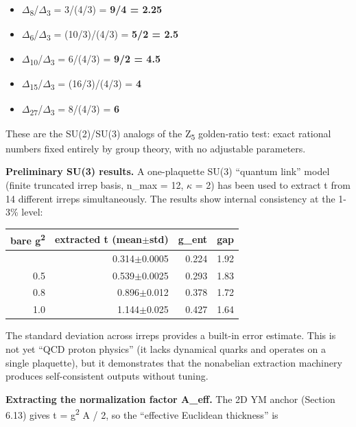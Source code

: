 \documentclass[11pt,a4paper]{article}
\theoremstyle{remark}
\providecommand{\tightlist}{%
  \setlength{\itemsep}{0pt}\setlength{\parskip}{0pt}}
\begin{document}
\begin{itemize}
\tightlist
\item
  \ensuremath{\Delta}\textsubscript{8}/\ensuremath{\Delta}\textsubscript{3} = 3/(4/3) = \textbf{9/4 = 2.25}
\item
  \ensuremath{\Delta}\textsubscript{6}/\ensuremath{\Delta}\textsubscript{3} = (10/3)/(4/3) = \textbf{5/2 = 2.5}
\item
  \ensuremath{\Delta}\textsubscript{10}/\ensuremath{\Delta}\textsubscript{3} = 6/(4/3) = \textbf{9/2 = 4.5}
\item
  \ensuremath{\Delta}\textsubscript{15}/\ensuremath{\Delta}\textsubscript{3} = (16/3)/(4/3) = \textbf{4}
\item
  \ensuremath{\Delta}\textsubscript{27}/\ensuremath{\Delta}\textsubscript{3} = 8/(4/3) = \textbf{6}
\end{itemize}

These are the SU(2)/SU(3) analogs of the Z\textsubscript{5} golden-ratio test: exact
rational numbers fixed entirely by group theory, with no adjustable parameters.

\textbf{Preliminary SU(3) results.} A one-plaquette SU(3) ``quantum link'' model
(finite truncated irrep basis, n\_max = 12, \ensuremath{\kappa} = 2) has been used to
extract t from 14 different irreps simultaneously. The results show internal
consistency at the 1-3\% level:

{\def\LTcaptype{none} %
\begin{longtable}[]{@{}rrrr@{}}
\toprule\noalign{}
bare g\textsuperscript{2} & extracted t (mean\ensuremath{\pm}std) & g\_ent & gap \\
\midrule\noalign{}
\endhead
\bottomrule\noalign{}
\endlastfoot
0.3 & 0.314\ensuremath{\pm}0.0005 & 0.224 & 1.92 \\
0.5 & 0.539\ensuremath{\pm}0.0025 & 0.293 & 1.83 \\
0.8 & 0.896\ensuremath{\pm}0.012 & 0.378 & 1.72 \\
1.0 & 1.144\ensuremath{\pm}0.025 & 0.427 & 1.64 \\
\end{longtable}
}

The standard deviation across irreps provides a built-in error estimate. This is
not yet ``QCD proton physics'' (it lacks dynamical quarks and operates on a single
plaquette), but it demonstrates that the nonabelian extraction machinery produces
self-consistent outputs without tuning.

\textbf{Extracting the normalization factor A\_eff.} The 2D YM anchor
(Section 6.13) gives t = g\textsuperscript{2} A / 2, so the ``effective Euclidean thickness'' is
\end{document}
